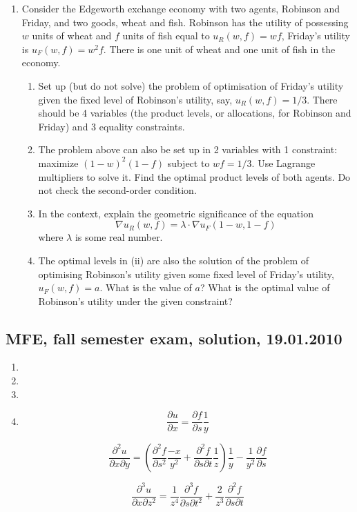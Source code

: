 \begin{enumerate}[resume]
\item Consider the Edgeworth exchange economy with two agents, Robinson and Friday,
and two goods, wheat and fish. Robinson has the utility of possessing $w$ units of wheat
and $f$ units of fish equal to $u_R(w, f) = wf$, Friday’s utility is $u_F(w, f) = w^2 f$. There is one unit of wheat and one unit of fish in the economy.
\begin{enumerate}
\item Set up (but do not solve) the problem of optimisation of Friday’s utility given the
fixed level of Robinson’s utility, say, $u_R(w, f ) = 1/3$. There should be 4 variables (the product levels, or allocations, for Robinson and Friday) and 3 equality constraints.
\item The problem above can also be set up in 2 variables with 1 constraint: maximize
$(1-w)^2(1-f)$ subject to $wf = 1/3$. Use Lagrange multipliers to solve it. Find the optimal product levels of both agents. Do not check the second-order condition.
\item In the context, explain the geometric significance of the equation
\[
\nabla u_R (w, f ) = \lambda\cdot \nabla u_F (1 - w, 1 - f )
\]
where $\lambda$ is some real number.
\item The optimal levels in (ii) are also the solution of the problem of optimising Robinson’s utility given some fixed level of Friday’s utility, $u_F(w,f) = a$. What is the value of $a$? What is the optimal value of Robinson’s utility under the given constraint?
\end{enumerate}


\end{enumerate}


\subsection{MFE, fall semester exam, solution, 19.01.2010}

\begin{enumerate}
\item
\item
\item
\item
\[
\frac{\partial u}{\partial x} = \frac{\partial f}{\partial s} \frac{1}{y}
\]

\[
\frac{\partial^2 u}{\partial x\partial y} = \left(\frac{\partial^2 f}{\partial s^2} \frac{-x}{y^2}+ \frac{\partial^2 f}{\partial s\partial t}\frac{1}{z}\right)\frac{1}{y} - \frac{1}{y^2}  \frac{\partial f}{\partial s}
\]

\[
\frac{\partial^3 u}{\partial x\partial z^2} = \frac{1}{z^4} \frac{\partial^3 f}{\partial s\partial t^2} + \frac{2}{z^3} \frac{\partial^2 f}{\partial s\partial t}
\]

\end{enumerate}

